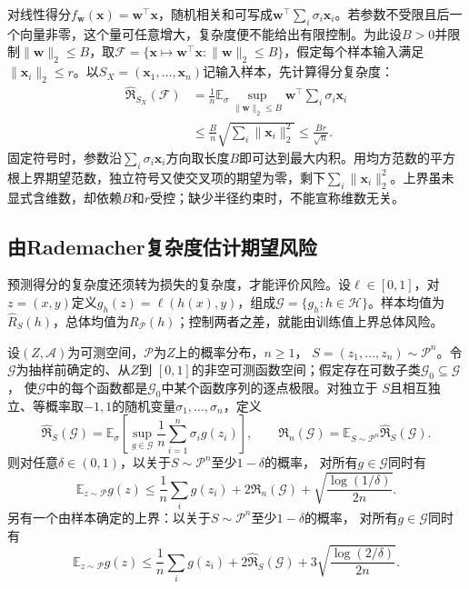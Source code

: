 对线性得分$f_{\bm w}(\bm x)=\bm w^\top\bm x$，随机相关和可写成$\bm w^\top\sum_i\sigma_i\bm x_i$。若参数不受限且后一个向量非零，这个量可任意增大，复杂度便不能给出有限控制。为此设$B>0$并限制$\|\bm w\|_2\leq B$，取$\mathcal F=\{\bm x\mapsto\bm w^\top\bm x:\|\bm w\|_2\leq B\}$，假定每个样本输入满足$\|\bm x_i\|_2\leq r$。以$S_X=(\bm x_1,\ldots,\bm x_n)$记输入样本，先计算得分复杂度：
\begin{align}
 \widehat{\mathfrak R}_{S_X}(\mathcal F)
 &=\frac1n\mathbb E_\sigma\sup_{\lVert\bm{w}\rVert_2\leq B}
   \bm{w}^\top\sum_i\sigma_i \bm{x}_i\nonumber\\
 &\leq\frac{B}{n}\sqrt{\sum_i\lVert\bm{x}_i\rVert_2^2}
 \leq\frac{Br}{\sqrt n}.
 \label{eq:linear-rademacher-bound}
\end{align}
固定符号时，参数沿$\sum_i\sigma_i\bm x_i$方向取长度$B$即可达到最大内积。用均方范数的平方根上界期望范数，独立符号又使交叉项的期望为零，剩下$\sum_i\|\bm x_i\|_2^2$。上界虽未显式含维数，却依赖$B$和$r$受控；缺少半径约束时，不能宣称维数无关。

\subsection{由Rademacher复杂度估计期望风险}

预测得分的复杂度还须转为损失的复杂度，才能评价风险。设$\ell\in[0,1]$，对$z=(x,y)$定义$g_h(z)=\ell(h(x),y)$，组成$\mathcal G=\{g_h:h\in\mathcal H\}$。样本均值为$\hat R_S(h)$，总体均值为$R_{\mathcal P}(h)$；控制两者之差，就能由训练值上界总体风险。

\begin{theorem}[Rademacher复杂度给出的期望风险上界]
\label{thm:rademacher-risk-bound}
设$(Z,\mathcal A)$为可测空间，$\mathcal P$为$Z$上的概率分布，$n\geq1$，
$S=(z_1,\ldots,z_n)\sim\mathcal P^n$。令$\mathcal G$为抽样前确定的、从$Z$到
$[0,1]$的非空可测函数空间；假定存在可数子类$\mathcal G_0\subseteq\mathcal G$，
使$\mathcal G$中的每个函数都是$\mathcal G_0$中某个函数序列的逐点极限。对独立于
$S$且相互独立、等概率取$-1,1$的随机变量$\sigma_1,\ldots,\sigma_n$，定义
\[
 \widehat{\mathfrak R}_S(\mathcal G)
 =\mathbb E_\sigma\left[\sup_{g\in\mathcal G}
   \frac1n\sum_{i=1}^n\sigma_i g(z_i)\right],\qquad
 \mathfrak R_n(\mathcal G)
 =\mathbb E_{S\sim\mathcal P^n}\widehat{\mathfrak R}_S(\mathcal G).
\]
则对任意$\delta\in(0,1)$，以关于$S\sim\mathcal P^n$至少$1-\delta$的概率，
对所有$g\in\mathcal G$同时有
\begin{equation}
 \mathbb E_{z\sim\mathcal P}g(z)
 \leq\frac1n\sum_i g(z_i)+2\mathfrak R_n(\mathcal G)
 +\sqrt{\frac{\log(1/\delta)}{2n}}.
 \label{eq:rademacher-risk-bound}
\end{equation}
另有一个由样本确定的上界：以关于$S\sim\mathcal P^n$至少$1-\delta$的概率，
对所有$g\in\mathcal G$同时有
\begin{equation}
 \mathbb E_{z\sim\mathcal P}g(z)
 \leq\frac1n\sum_i g(z_i)+2\widehat{\mathfrak R}_S(\mathcal G)
 +3\sqrt{\frac{\log(2/\delta)}{2n}}.
 \label{eq:empirical-rademacher-risk-bound}
\end{equation}
\end{theorem}

